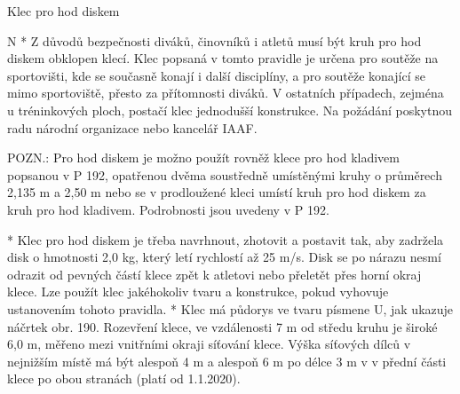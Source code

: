 \enditems

\secc Klec pro hod diskem

\begitems \style N
* Z důvodů bezpečnosti diváků, činovníků i atletů musí být kruh pro hod diskem obklopen klecí. Klec popsaná v tomto pravidle je určena pro soutěže na sportovišti, kde se současně konají i další disciplíny, a pro soutěže konající se mimo sportoviště, přesto za přítomnosti diváků. V ostatních případech, zejména u tréninkových ploch, postačí klec jednodušší konstrukce. Na požádání poskytnou radu národní organizace nebo kancelář IAAF.

POZN.: Pro hod diskem je možno použít rovněž klece pro hod kladivem popsanou v P 192, opatřenou dvěma soustředně umístěnými kruhy o průměrech 2,135 m a 2,50 m nebo se v prodloužené kleci umístí kruh pro hod diskem za kruh pro hod kladivem. Podrobnosti jsou uvedeny v P 192.

* Klec pro hod diskem je třeba navrhnout, zhotovit a postavit tak, aby zadržela disk o hmotnosti 2,0 kg, který letí rychlostí až 25 m/s. Disk se po nárazu nesmí odrazit od pevných částí klece zpět k atletovi nebo přeletět přes horní okraj klece. Lze použít klec jakéhokoliv tvaru a konstrukce, pokud vyhovuje ustanovením tohoto pravidla.
* Klec má půdorys ve tvaru písmene U, jak ukazuje náčrtek obr. 190. Rozevření klece, ve vzdálenosti 7 m od středu kruhu je široké 6,0 m, měřeno mezi vnitřními okraji síťování klece. Výška síťových dílců v nejnižším místě má být alespoň 4 m a alespoň 6 m po délce 3 m v v přední části klece po obou stranách (platí od 1.1.2020).

